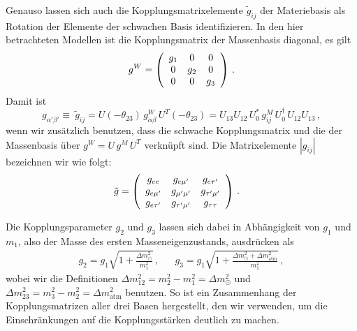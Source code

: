 Genauso lassen sich auch die Kopplungsmatrixelemente $\tilde{g}_{i j}$ der Materiebasis als Rotation der Elemente der schwachen Basis identifizieren.
In den hier betrachteten Modellen ist die Kopplungsmatrix der Massenbasis diagonal, es gilt
\begin{equation}
    g^W = \left( \begin{array}{c c c}
        g_1         &   0     &     0   \\ 
        0           &   g_2   &     0   \\ 
        0           &   0     &     g_3  \\
    \end{array}\right) \,.
    \label{eq:schwachekopplung}
\end{equation}
Damit ist
\begin{equation}
    g_{\alpha' \beta'} \equiv \ \tilde{g}_{i j} = U(-\theta_{2 3}) \, g^W_{\alpha \beta} \, U^T(-\theta_{2 3}) = U_{1 3} U_{1 2} \, U^*_0 \, g^M_{i j} \, U^\dagger_0 \, U_{1 2} U_{1 3} \,,
\end{equation}
wenn wir zusätzlich benutzen, dass die schwache Kopplungsmatrix und die der Massenbasis über $g^W = U \, g^M \, U^T$ verknüpft sind.
Die Matrixelemente $|g_{ij}|$ bezeichnen wir wie folgt:
\begin{align}
    \tilde{g} &= \left( \begin{array}{c c c}
        g_{ee}                  &   g_{e \mu'}          &     g_{e \tau'}       \\ 
        g_{e \mu'}              &   g_{\mu' \mu'}       &     g_{\tau' \mu'}    \\ 
        g_{e \tau'}             &   g_{\tau' \mu'}      &     g_{\tau \tau}     \\
    \end{array}\right) \label{eq:materiekoppmat} \,.
\end{align}

Die Kopplungsparameter $g_2$ und $g_3$ lassen sich dabei in Abhängigkeit von $g_1$ und $m_1$, also der Masse des ersten Masseneigenzustands, ausdrücken als
\begin{align}
    g_2 = g_1 \sqrt{1 + \frac{\Delta m^2_\odot}{m^2_1}}\,, && g_3 = g_1 \sqrt{1 + \frac{\Delta m^2_\odot + \Delta m^2_\text{atm}}{m^2_1}} \,,
    \label{eq:g2g3}
\end{align}
wobei wir die Definitionen $\Delta m^2_{1 2} = m^2_2 - m^2_1 = \Delta m^2_\odot$ und $\Delta m^2_{23} = m^2_3 - m^2_2 = \Delta m^2_\text{atm}$ benutzen.
So ist ein Zusammenhang der Kopplungsmatrizen aller drei Basen hergestellt, den wir verwenden, um die Einschränkungen auf die Kopplungsstärken deutlich zu machen.


